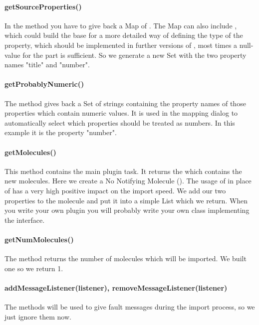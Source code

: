 \paragraph{getSourceProperties()}
In the  method you have to give back a Map of . The Map can also include , which  could build the base for a more detailed way of defining the type of the property, which should be implemented in further versions of \sh, most times a null-value for the  part is sufficient. So we generate a new Set with the two property names "title" and "number".

\paragraph{getProbablyNumeric()}
The  method gives back a Set of strings containing the property names of those properties which contain numeric values. It is used in the mapping dialog to automatically select which properties should be treated as numbers. In this example it is the property "number".

\paragraph{getMolecules()}
This method contains the main plugin task. It returns the  which contains the new molecules. Here we create a No Notifying Molecule (). The usage of  in place of  has a very high positive impact on the import speed. We add our two properties to the molecule and put it into a simple List which we return. When you write your own plugin you will probably write your own class implementing the  interface.

\paragraph{getNumMolecules()}
The  method returns the number of molecules which will be imported. We built one  so we return 1.

\paragraph{addMessageListener(listener), removeMessageListener(listener)}
The  methods will be used to give fault messages during the import process, so we just ignore them now.

